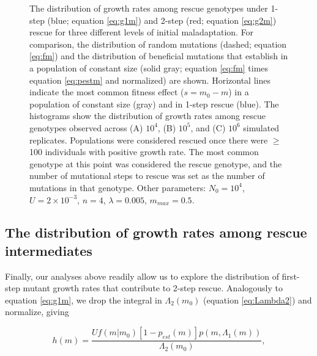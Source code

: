 \documentclass[9pt,twocolumn,twoside,lineno]{gsajnl}
\begin{document}
\begin{figure}[htbp]
\caption{
The distribution of growth rates among rescue genotypes under 1-step (blue; equation \ref{eq:g1m}) and 2-step (red; equation \ref{eq:g2m}) rescue for three different levels of initial maladaptation.
For comparison, the distribution of random mutations (dashed; equation \ref{eq:fm}) and the distribution of beneficial mutations that establish in a population of constant size (solid gray; equation \ref{eq:fm} times equation \ref{eq:pestm} and normalized) are shown.
Horizontal lines indicate the most common fitness effect ($s=m_0-m$) in a population of constant size (gray) and in 1-step rescue (blue).
The histograms show the distribution of growth rates among rescue genotypes observed across (A) $10^4$, (B) $10^5$, and (C) $10^6$ simulated replicates.
Populations were considered rescued once there were $\geq$100 individuals with positive growth rate.
The most common genotype at this point was considered the rescue genotype, and the number of mutational steps to rescue was set as the number of mutations in that genotype. 
Other parameters: $N_0=10^4$, $U=2\times 10^{-3}$, $n=4$, $\lambda=0.005$, $m_{max}=0.5$.
}%
\label{fig:1and2stepDFE}
\end{figure}

\subsection{The distribution of growth rates among rescue intermediates}
\label{sec:m1DFE}

Finally, our analyses above readily allow us to explore the distribution of first-step mutant growth rates that contribute to 2-step rescue.
Analogously to equation \ref{eq:g1m}, we drop the integral in $\Lambda_2(m_0)$ (equation \ref{eq:Lambda2}) and normalize, giving

\begin{equation}\label{eq:hm}
h(m) = \frac{U f(m|m_0) \left[ 1 - p_{est}(m) \right] p(m,\Lambda_{1}(m))}{\Lambda_2(m_0)},
\end{equation}
\end{document}
